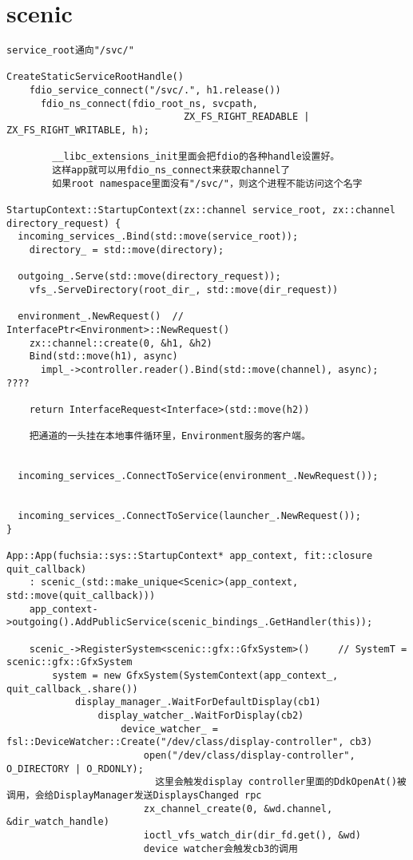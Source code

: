 \section{scenic}

\begin{verbatim}
service_root通向"/svc/"

CreateStaticServiceRootHandle()
    fdio_service_connect("/svc/.", h1.release())
      fdio_ns_connect(fdio_root_ns, svcpath,
                               ZX_FS_RIGHT_READABLE | ZX_FS_RIGHT_WRITABLE, h);

        __libc_extensions_init里面会把fdio的各种handle设置好。
        这样app就可以用fdio_ns_connect来获取channel了
        如果root namespace里面没有"/svc/"，则这个进程不能访问这个名字

StartupContext::StartupContext(zx::channel service_root, zx::channel directory_request) {
  incoming_services_.Bind(std::move(service_root));
    directory_ = std::move(directory);
  
  outgoing_.Serve(std::move(directory_request));
    vfs_.ServeDirectory(root_dir_, std::move(dir_request))
  
  environment_.NewRequest()  // InterfacePtr<Environment>::NewRequest()
    zx::channel::create(0, &h1, &h2)
    Bind(std::move(h1), async)
      impl_->controller.reader().Bind(std::move(channel), async);  ????
    
    return InterfaceRequest<Interface>(std::move(h2))

    把通道的一头挂在本地事件循环里，Environment服务的客户端。


  incoming_services_.ConnectToService(environment_.NewRequest());


  incoming_services_.ConnectToService(launcher_.NewRequest());
}

App::App(fuchsia::sys::StartupContext* app_context, fit::closure quit_callback)
    : scenic_(std::make_unique<Scenic>(app_context, std::move(quit_callback)))
    app_context->outgoing().AddPublicService(scenic_bindings_.GetHandler(this));
    
    scenic_->RegisterSystem<scenic::gfx::GfxSystem>()     // SystemT = scenic::gfx::GfxSystem
        system = new GfxSystem(SystemContext(app_context_, quit_callback_.share())
            display_manager_.WaitForDefaultDisplay(cb1)
                display_watcher_.WaitForDisplay(cb2)
                    device_watcher_ = fsl::DeviceWatcher::Create("/dev/class/display-controller", cb3)
                        open("/dev/class/display-controller", O_DIRECTORY | O_RDONLY);
                          这里会触发display controller里面的DdkOpenAt()被调用，会给DisplayManager发送DisplaysChanged rpc
                        zx_channel_create(0, &wd.channel, &dir_watch_handle)
                        ioctl_vfs_watch_dir(dir_fd.get(), &wd)
                        device watcher会触发cb3的调用


\end{verbatim}

